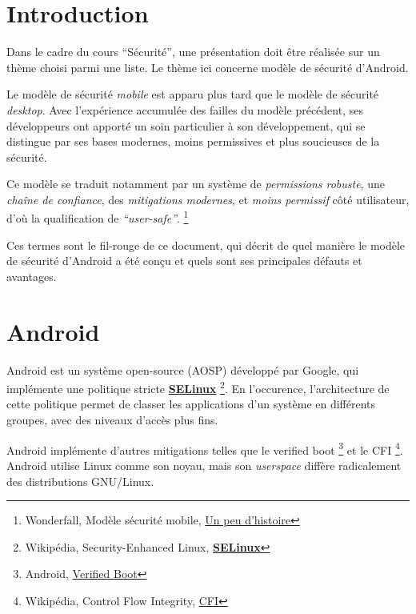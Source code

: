 \documentclass[
  french,
  paper=a4,
  ,captions=tableheading
]{scrartcl}
\begin{document}
\newpage

\hypertarget{introduction}{%
\section{Introduction}\label{introduction}}

Dans le cadre du cours ``Sécurité'', une présentation doit être réalisée
sur un thème choisi parmi une liste. Le thème ici concerne modèle de
sécurité d'Android.

Le modèle de sécurité \emph{mobile} est apparu plus tard que le modèle
de sécurité \emph{desktop}. Avec l'expérience accumulée des failles du
modèle précédent, ses développeurs ont apporté un soin particulier à son
développement, qui se distingue par ses bases modernes, moins
permissives et plus soucieuses de la sécurité.

Ce modèle se traduit notamment par un système de \emph{permissions
robuste}, une \emph{chaîne de confiance}, des \emph{mitigations
modernes}, et \emph{moins permissif} côté utilisateur, d'où la
qualification de \emph{``user-safe''}. \footnote{Wonderfall, Modèle
  sécurité mobile,
  \href{https://wonderfall.space/modele-securite-mobile/}{Un peu
  d'histoire}}

Ces termes sont le fil-rouge de ce document, qui décrit de quel manière
le modèle de sécurité d'Android a été conçu et quels sont ses
principales défauts et avantages.

\hypertarget{android}{%
\section{Android}\label{android}}

Android est un système open-source (AOSP) développé par Google, qui
implémente une politique stricte
\href{https://fr.wikipedia.org/wiki/SELinux}{\textbf{SELinux}}
\footnote{Wikipédia, Security-Enhanced Linux,
  \href{https://fr.wikipedia.org/wiki/SELinux}{\textbf{SELinux}}}. En
l'occurence, l'architecture de cette politique permet de classer les
applications d'un système en différents groupes, avec des niveaux
d'accès plus fins.

Android implémente d'autres mitigations telles que le verified boot
\footnote{Android,
  \href{https://source.android.com/security/verifiedboot}{Verified Boot}}
et le CFI \footnote{Wikipédia, Control Flow Integrity,
  \href{https://en.wikipedia.org/wiki/Control-flow_integrity}{CFI}}.
Android utilise Linux comme son noyau, mais son \emph{userspace} diffère
radicalement des distributions GNU/Linux.
\end{document}
